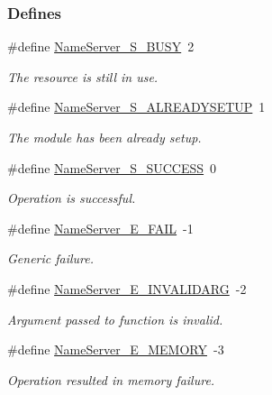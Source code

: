 \subsubsection*{Defines}
\begin{DoxyCompactItemize}
\item 
\#define \hyperlink{_name_server_8h_a57542b4fd6b5d46d78064ae92215bc4b}{NameServer\_\-S\_\-BUSY}~2
\begin{DoxyCompactList}\small\item\em The resource is still in use. \item\end{DoxyCompactList}\item 
\#define \hyperlink{_name_server_8h_a66224beb4a7f1cc92923a8fe630429ce}{NameServer\_\-S\_\-ALREADYSETUP}~1
\begin{DoxyCompactList}\small\item\em The module has been already setup. \item\end{DoxyCompactList}\item 
\#define \hyperlink{_name_server_8h_a49cbe5edf8e519b17e323d01431e8161}{NameServer\_\-S\_\-SUCCESS}~0
\begin{DoxyCompactList}\small\item\em Operation is successful. \item\end{DoxyCompactList}\item 
\#define \hyperlink{_name_server_8h_a2ffd6887c6aca49d73982fb226db679c}{NameServer\_\-E\_\-FAIL}~-\/1
\begin{DoxyCompactList}\small\item\em Generic failure. \item\end{DoxyCompactList}\item 
\#define \hyperlink{_name_server_8h_a213957efe13b0c8ec3d52e31a708b56f}{NameServer\_\-E\_\-INVALIDARG}~-\/2
\begin{DoxyCompactList}\small\item\em Argument passed to function is invalid. \item\end{DoxyCompactList}\item 
\#define \hyperlink{_name_server_8h_a917b53c5df7ca0d6ecdc29c269fa0c2c}{NameServer\_\-E\_\-MEMORY}~-\/3
\begin{DoxyCompactList}\small\item\em Operation resulted in memory failure. \item\end{DoxyCompactList}\item 

\end{DoxyCompactItemize}
